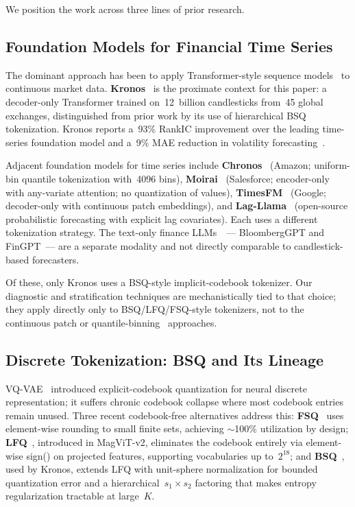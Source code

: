 \documentclass[10pt]{article}
\begin{document}
We position the work across three lines of prior research.

\subsection{Foundation Models for Financial Time Series}

The dominant approach has been to apply Transformer-style sequence
models~\citep{vaswani2017} to continuous market
data. \textbf{Kronos}~\citep{kronos2025} is the proximate context for
this paper: a decoder-only Transformer trained on~12~billion
candlesticks from~45 global exchanges, distinguished from prior work
by its use of hierarchical BSQ tokenization. Kronos reports a~93\%
RankIC improvement over the leading time-series foundation model and
a~9\% MAE reduction in volatility forecasting~\citep{kronos2025}.

Adjacent foundation models for time series include
\textbf{Chronos}~\citep{chronos2024} (Amazon; uniform-bin quantile
tokenization with~4096 bins), \textbf{Moirai}~\citep{moirai2024}
(Salesforce; encoder-only with any-variate attention; no quantization
of values), \textbf{TimesFM}~\citep{timesfm2024} (Google; decoder-only
with continuous patch embeddings), and
\textbf{Lag-Llama}~\citep{lagllama2023} (open-source probabilistic
forecasting with explicit lag covariates). Each uses a different
tokenization strategy. The text-only finance
LLMs~\citep{bloomberggpt2023, fingpt2023}~--- BloombergGPT and
FinGPT~--- are a separate modality and not directly comparable to
candlestick-based forecasters.

Of these, only Kronos uses a BSQ-style implicit-codebook
tokenizer. Our diagnostic and stratification techniques are
mechanistically tied to that choice; they apply directly only to
BSQ/LFQ/FSQ-style tokenizers, not to the continuous patch
\citep{timesfm2024} or quantile-binning~\citep{chronos2024} approaches.

\subsection{Discrete Tokenization: BSQ and Its Lineage}

VQ-VAE~\citep{vqvae2017} introduced explicit-codebook quantization
for neural discrete representation; it suffers chronic codebook
collapse where most codebook entries remain unused. Three recent
codebook-free alternatives address this:
\textbf{FSQ}~\citep{fsq2024} uses element-wise rounding to small
finite sets, achieving \mbox{$\sim$100\%} utilization by design;
\textbf{LFQ}~\citep{lfq2024}, introduced in MagViT-v2, eliminates the
codebook entirely via element-wise sign() on projected features,
supporting vocabularies up to~$2^{18}$; and
\textbf{BSQ}~\citep{bsq2024}, used by Kronos, extends LFQ with
unit-sphere normalization for bounded quantization error and a
hierarchical~$s_1 \times s_2$ factoring that makes entropy
regularization tractable at large~$K$.
\end{document}
